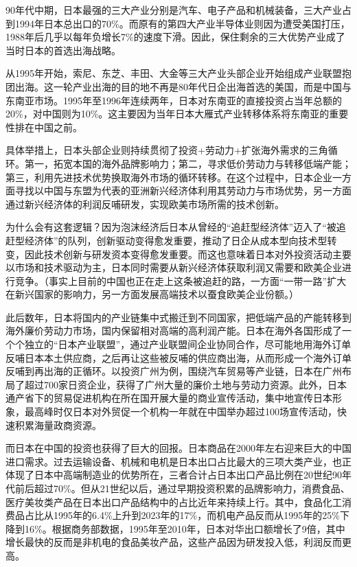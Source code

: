 90年代中期，日本最强的三大产业分别是汽车、电子产品和机械装备，三大产业占到1994年日本总出口的70\%。而原有的第四大产业半导体业则因为遭受美国打压，1988年后几乎以每年负增长7\%的速度下滑。因此，保住剩余的三大优势产业成了当时日本的首选出海战略。

从1995年开始，索尼、东芝、丰田、大金等三大产业头部企业开始组成产业联盟抱团出海。这一轮产业出海的目的地不再是80年代日企出海首选的美国，而是中国与东南亚市场。1995年至1996年连续两年，日本对东南亚的直接投资占当年总额的20\%，对中国则为10\%。这主要因为当年日本大雁式产业转移体系将东南亚的重要性排在中国之前。

具体举措上，日本头部企业则持续贯彻了投资+劳动力+扩张海外需求的三角循环。第一，拓宽本国的海外品牌影响力；第二，寻求低价劳动力与转移低端产能；第三，利用先进技术优势换取海外市场的循环转移。在这个过程中，日本企业一方面寻找以中国与东盟为代表的亚洲新兴经济体利用其劳动力与市场优势，另一方面通过新兴经济体的利润反哺研发，实现欧美市场所需的技术创新。

为什么会有这套逻辑？因为泡沫经济后日本从曾经的“追赶型经济体”迈入了“被追赶型经济体”的队列，创新驱动变得愈发重要，推动了日企从成本型向技术型转变，因此技术创新与研发资本变得愈发重要。而这也意味着日本对外投资活动主要以市场和技术驱动为主，日本同时需要从新兴经济体获取利润又需要和欧美企业进行竞争。（事实上目前的中国也正在走上这条被追赶的路，一方面“一带一路”扩大在新兴国家的影响力，另一方面发展高端技术以蚕食欧美企业份额。）

此后数年，日本将国内的产业链集中式搬迁到不同国家，把低端产品的产能转移到海外廉价劳动力市场，国内保留相对高端的高利润产能。日本在海外各国形成了一个个独立的“日本产业联盟”，通过产业联盟间企业协同合作，尽可能地用海外订单反哺日本本土供应商，之后再让这些被反哺的供应商出海，从而形成一个海外订单反哺到再出海的正循环。以投资广州为例，围绕汽车贸易等产业链，日本在广州布局了超过700家日资企业，获得了广州大量的廉价土地与劳动力资源。此外，日本通产省下的贸易促进机构在所在国开展大量的商业宣传活动，集中地宣传日本形象，最高峰时仅日本对外贸促一个机构一年就在中国举办超过100场宣传活动，快速积累海量政商资源。

而日本在中国的投资也获得了巨大的回报。日本商品在2000年左右迎来巨大的中国进口需求。过去运输设备、机械和电机是日本出口占比最大的三项大类产业，也正体现了日本中高端制造业的优势所在，三者合计占日本出口产品比例在20世纪90年代前后超过70\%。但从21世纪以后，通过早期投资积累的品牌影响力，消费食品、医疗美妆类产品在日本出口产品结构中的占比近年来持续上行。其中，食品化工消费品占比从1995年的6.4\%上升到2023年的17\%，而机电产品反而从1995年的25\%下降到16\%。根据商务部数据，1995年至2010年，日本对华出口额增长了9倍，其中增长最快的反而是非机电的食品美妆产品，这些产品因为研发投入低，利润反而更高。

